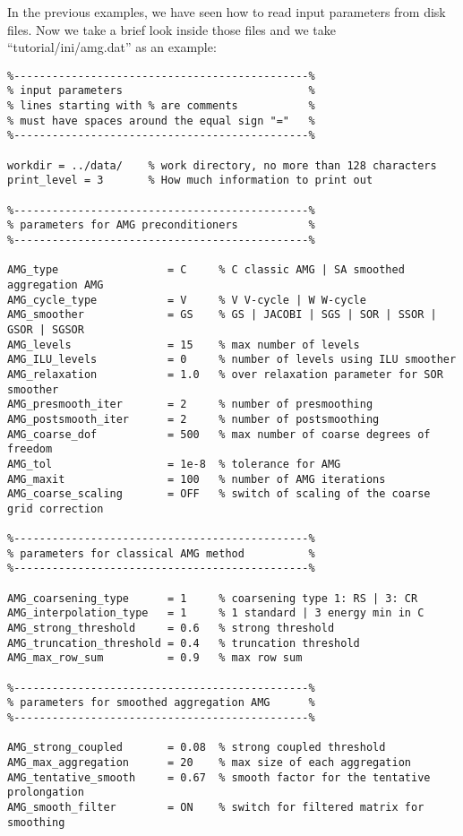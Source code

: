 \documentclass[11pt]{memoir}
\begin{document}
In the previous examples, we have seen how to read input parameters from disk files. Now we take a brief look inside those files and we take ``tutorial/ini/amg.dat'' as an example:
%
\begin{lstlisting}
%----------------------------------------------%
% input parameters                             %
% lines starting with % are comments           %
% must have spaces around the equal sign "="   %
%----------------------------------------------%

workdir = ../data/    % work directory, no more than 128 characters
print_level = 3       % How much information to print out 
 
%----------------------------------------------%
% parameters for AMG preconditioners           %
%----------------------------------------------%

AMG_type                 = C     % C classic AMG | SA smoothed aggregation AMG
AMG_cycle_type           = V     % V V-cycle | W W-cycle         
AMG_smoother             = GS    % GS | JACOBI | SGS | SOR | SSOR | GSOR | SGSOR
AMG_levels               = 15    % max number of levels
AMG_ILU_levels           = 0     % number of levels using ILU smoother
AMG_relaxation           = 1.0   % over relaxation parameter for SOR smoother
AMG_presmooth_iter       = 2     % number of presmoothing
AMG_postsmooth_iter      = 2     % number of postsmoothing
AMG_coarse_dof           = 500   % max number of coarse degrees of freedom
AMG_tol                  = 1e-8  % tolerance for AMG
AMG_maxit                = 100   % number of AMG iterations
AMG_coarse_scaling       = OFF   % switch of scaling of the coarse grid correction

%----------------------------------------------%
% parameters for classical AMG method          %
%----------------------------------------------%

AMG_coarsening_type      = 1     % coarsening type 1: RS | 3: CR
AMG_interpolation_type   = 1     % 1 standard | 3 energy min in C 
AMG_strong_threshold     = 0.6   % strong threshold
AMG_truncation_threshold = 0.4   % truncation threshold
AMG_max_row_sum          = 0.9   % max row sum

%----------------------------------------------%
% parameters for smoothed aggregation AMG      %
%----------------------------------------------%

AMG_strong_coupled       = 0.08  % strong coupled threshold
AMG_max_aggregation      = 20    % max size of each aggregation 
AMG_tentative_smooth     = 0.67  % smooth factor for the tentative prolongation
AMG_smooth_filter        = ON    % switch for filtered matrix for smoothing
\end{lstlisting}
\end{document}
